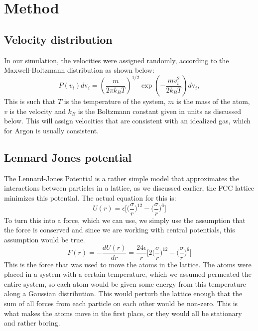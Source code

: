 \documentclass[11pt,twocolumn]{article}
\begin{document}
\section{Method}
\subsection{Velocity distribution}
In our simulation, the velocities were assigned randomly, according to the Maxwell-Boltzmann distribution as shown below:  
\begin{equation}
P(v_i)d\mathrm{v}_i = \left(\frac{m}{2\pi k_B
T}\right)^{1/2} \exp\left(-\frac{m v_i^2}{2k_B T}\right)d\mathrm{v}_i,
\end{equation}
This is such that $T$ is the temperature of the system, $m$ is the mass of the atom, $v$ is the velocity and $k_B$ is the Boltzmann constant given in units as discussed below. This will assign velocities that are consistent with an idealized gas, which for Argon is usually consistent. 
\subsection{Lennard Jones potential}
The Lennard-Jones Potential is a rather simple model that approximates the interactions between particles in a lattice, as we discussed earlier, the FCC lattice minimizes this potential. The actual equation for this is:
\begin{equation}
U(r)=\epsilon\bigg[\bigg(\frac{\sigma}{r}\bigg)^{12}-\bigg(\frac{\sigma}{r}\bigg)^6\bigg]
\end{equation}
To turn this into a force, which we can use, we simply use the assumption that the force is conserved and since we are working with central potentials, this assumption would be true.
\begin{equation}
F(r)=-\frac{dU(r)}{dr}=\frac{24\epsilon}{r}\bigg[2\bigg(\frac{\sigma}{r}\bigg)^{12}-\bigg(\frac{\sigma}{r}\bigg)^6\bigg]
\end{equation}
This is the force that was used to move the atoms in the lattice. The atoms were placed in a system with a certain temperature, which we assumed permeated the entire system, so each atom would be given some energy from this temperature along a Gaussian distribution. This would perturb the lattice enough that the sum of all forces from each particle on each other would be non-zero. This is what makes the atoms move in the first place, or they would all be stationary and rather boring. 
\end{document}
